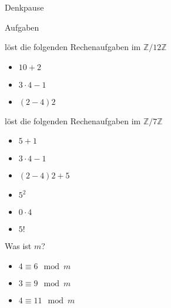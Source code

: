 {
\begin{frame}[fragile]{Denkpause}
    \footnotesize
        \begin{alertblock}{Aufgaben}
        \end{alertblock}
        \begin{block}{löst die folgenden Rechenaufgaben im $\mathbb Z/12\mathbb Z$}
            \begin{multicols}{3}
            \begin{itemize}
                \item $10 + 2$
                \item $3\cdot4-1$
                \item $(2-4)2$
            \end{itemize}
            \end{multicols}
        \end{block}
        \begin{block}{löst die folgenden Rechenaufgaben im $\mathbb Z/7\mathbb Z$}
            \begin{multicols}{3}
            \begin{itemize}
                \item $5 + 1$
                \item $3\cdot4-1$
                \item $(2-4)2+5$
                \item $5^2$
                \item $0\cdot4$
                \item $5!$
            \end{itemize}
            \end{multicols}
        \end{block}
        \begin{block}{Was ist $m$?}
            \begin{multicols}{3}
            \begin{itemize}
                \item $4 \equiv 6 \mod m$
                \item $3 \equiv 9 \mod m$
                \item $4 \equiv 11 \mod m$
            \end{itemize}
            \end{multicols}
        \end{block}
\end{frame}

}
